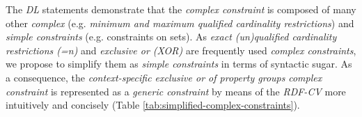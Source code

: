 \documentclass[a4paper,fontsize=11pt]{scrartcl}
\begin{document}

The \emph{DL} statements demonstrate that the \emph{complex constraint} 
is composed of many other \emph{complex} (e.g. \emph{minimum and maximum qualified cardinality restrictions}) and \emph{simple constraints} (e.g. constraints on sets).
As \emph{exact (un)qualified cardinality restrictions (=n)} and \emph{exclusive or (XOR)} are frequently used \emph{complex constraints},
we propose to simplify them as \emph{simple constraints} in terms of syntactic sugar.
As a consequence, the \emph{context-specific exclusive or of property groups} \emph{complex constraint} is represented as a \emph{generic constraint} by means of the \emph{RDF-CV} more intuitively and concisely (Table \ref{tab:simplified-complex-constraints}).
\end{document}
